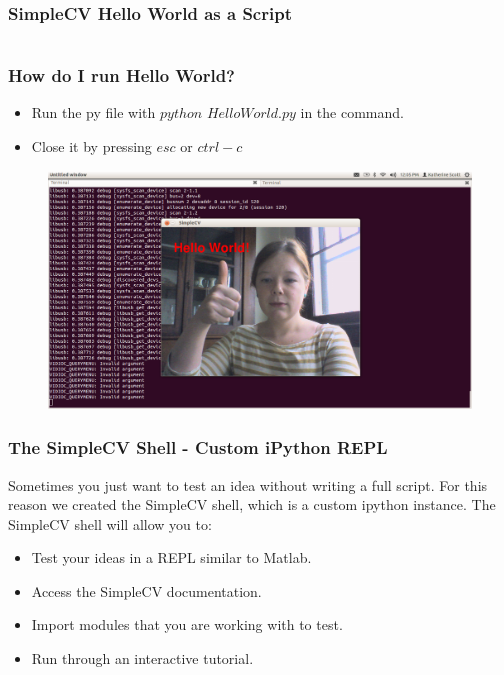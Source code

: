 \documentclass{beamer}
\begin{document}

\begin{frame}[fragile] %
\frametitle{SimpleCV Hello World as a Script}
\begin{example}[HelloWorld.py]
 \inputminted[linenos=true, tabsize=4,
 fontsize=\small]{python}{HelloWorld.py}
\end{example}
\end{frame}
\begin{frame}
\frametitle{How do I run Hello World?}
\begin{itemize}
\item Run the py file with $python$ $HelloWorld.py$ in the command.
\item Close it by pressing $esc$ or $ctrl-c$
\end{itemize}
\begin{figure}
  \includegraphics[width=0.8\linewidth]{HelloWorld1.png}
\end{figure}
\end{frame}

\begin{frame}
\frametitle{The SimpleCV Shell - Custom iPython REPL}
Sometimes you just want to test an idea without writing a full
script. For this reason we created the SimpleCV shell, which is a
custom ipython instance. The SimpleCV shell will allow you to:
\begin{itemize}
\item Test your ideas in a REPL similar to Matlab.
\item Access the SimpleCV documentation. 
\item Import modules that you are working with to test.
\item Run through an interactive tutorial. 
\end{itemize}
\end{frame}
\end{document}
